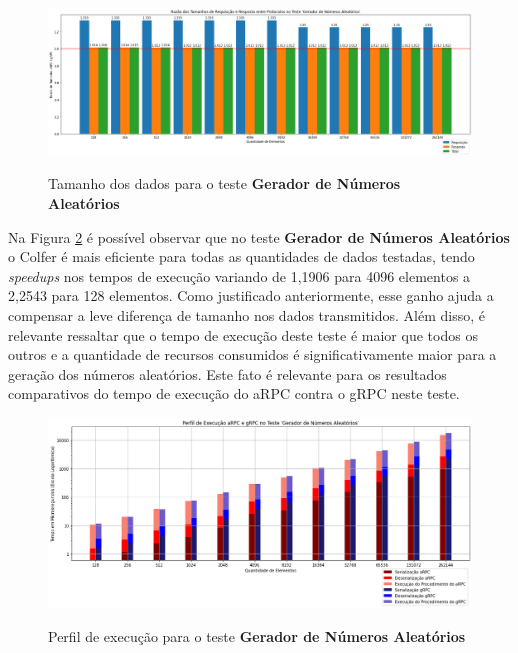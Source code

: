 \begin{figure}[ht]
    \centering
    \caption{Tamanho dos dados para o teste \textbf{Gerador de Números Aleatórios}}
    \includegraphics[width=\textwidth]{figuras/graficos/serializacao/razao_tamanho_getrandomnumbers.png} 
    \label{fig:razao_tamanho_getrandomnumbers}
\end{figure}

Na Figura \ref{fig:perfil_execucao_getrandomnumbers} é possível observar que no teste \textbf{Gerador de Números Aleatórios} o Colfer é mais eficiente para todas as quantidades de dados testadas, tendo \textit{speedups} nos tempos de execução variando de 1,1906 para 4096 elementos a 2,2543 para 128 elementos. Como justificado anteriormente, esse ganho ajuda a compensar a leve diferença de tamanho nos dados transmitidos. Além disso, é relevante ressaltar que o tempo de execução deste teste é maior que todos os outros e a quantidade de recursos consumidos é significativamente maior para a geração dos números aleatórios. Este fato é relevante para os resultados comparativos do tempo de execução do aRPC contra o gRPC neste teste.

\begin{figure}[H]
    \centering
    \caption{Perfil de execução para o teste \textbf{Gerador de Números Aleatórios}}
    \includegraphics[width=\textwidth]{figuras/graficos/serializacao/perfil_execucao_getrandomnumbers.png} 
    \label{fig:perfil_execucao_getrandomnumbers}
\end{figure}

